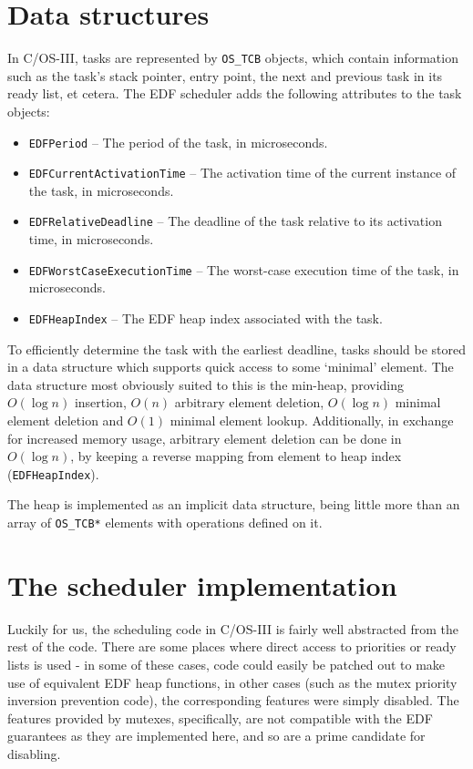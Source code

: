 \documentclass[twoside]{uva-inf-bachelor-thesis}
\newcommand{\code}[1]{\lstinline[breaklines=true]{#1}}
\newcommand{\ucosiii}{\textmu C/OS-III\xspace}
\begin{document}
\section{Data structures}
In \ucosiii, tasks are represented by \code{OS_TCB} objects, which contain information such as the task's stack pointer, entry point, the next and previous task in its ready list, et cetera. The EDF scheduler adds the following attributes to the task objects:

\begin{itemize}
    \item \code{EDFPeriod} -- The period of the task, in microseconds.
    \item \code{EDFCurrentActivationTime} -- The activation time of the current instance of the task, in microseconds.
    \item \code{EDFRelativeDeadline} -- The deadline of the task relative to its activation time, in microseconds.
    \item \code{EDFWorstCaseExecutionTime} -- The worst-case execution time of the task, in microseconds.
    \item \code{EDFHeapIndex} -- The EDF heap index associated with the task.
\end{itemize}

To efficiently determine the task with the earliest deadline, tasks should be stored in a data structure which supports quick access to some `minimal' element. The data structure most obviously suited to this is the min-heap, providing $O(\log n)$ insertion, $O(n)$ arbitrary element deletion, $O(\log n)$ minimal element deletion and $O(1)$ minimal element lookup. Additionally, in exchange for increased memory usage, arbitrary element deletion can be done in $O(\log n)$, by keeping a reverse mapping from element to heap index (\code{EDFHeapIndex}).

The heap is implemented as an implicit data structure, being little more than an array of \code{OS_TCB*} elements with operations defined on it.

\section{The scheduler implementation}
Luckily for us, the scheduling code in \ucosiii is fairly well abstracted from the rest of the code. There are some places where direct access to priorities or ready lists is used - in some of these cases, code could easily be patched out to make use of equivalent EDF heap functions, in other cases (such as the mutex priority inversion prevention code), the corresponding features were simply disabled. The features provided by mutexes, specifically, are not compatible with the EDF guarantees as they are implemented here, and so are a prime candidate for disabling.
\end{document}
